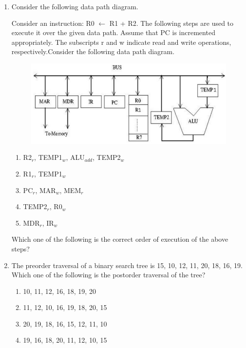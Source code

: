 \documentclass[journal,12pt,onecolumn]{IEEEtran}
\theoremstyle{remark}
\begin{document}
\begin{enumerate}
	\item Consider the following data path diagram.
	
	Consider an instruction: R0 $\leftarrow$ R1 + R2. The following steps are used to execute it over the given data path. Assume that PC is incremented appropriately. The subscripts r and w indicate read and write operations, respectively.Consider the following data path diagram.
	\begin{figure}[H]
		\centering
		\includegraphics[width=0.5\linewidth]{figs/4}
		\caption{}
		\label{fig:4}
	\end{figure}
	
	\begin{enumerate}
		\item R2$_r$, TEMP1$_w$, ALU$_{add}$, TEMP2$_w$
		\item R1$_r$, TEMP1$_w$
		\item PC$_r$, MAR$_w$, MEM$_r$
		\item TEMP2$_r$, R0$_w$
		\item MDR$_r$, IR$_w$
	\end{enumerate}
	Which one of the following is the correct order of execution of the above steps?
	
	\hfill{}
	\begin{enumerate}
	\end{enumerate}
	
	\item The preorder traversal of a binary search tree is 15, 10, 12, 11, 20, 18, 16, 19.
	Which one of the following is the postorder traversal of the tree?
	
	\hfill{\brak{\text{GATE CS 2020}}}
	\begin{enumerate}
		\item 10, 11, 12, 16, 18, 19, 20
		\item 11, 12, 10, 16, 19, 18, 20, 15
		\item 20, 19, 18, 16, 15, 12, 11, 10
		\item 19, 16, 18, 20, 11, 12, 10, 15
	\end{enumerate}
	

\end{enumerate}
\end{document}
